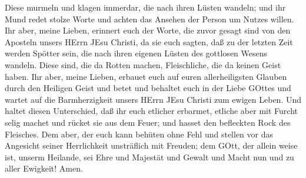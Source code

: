 Diese murmeln und klagen immerdar, die nach ihren Lüsten wandeln; und
ihr Mund redet stolze Worte und achten das Ansehen der Person um Nutzes
willen.  Ihr aber, meine Lieben, erinnert euch der Worte,
die zuvor gesagt sind von den Aposteln unsers HErrn JEsu Christi,
 da sie euch sagten, daß zu der letzten Zeit werden Spötter
sein, die nach ihren eigenen Lüsten des gottlosen Wesens wandeln.
 Diese sind, die da Rotten machen, Fleischliche, die da
keinen Geist haben.  Ihr aber, meine Lieben, erbauet euch
auf euren allerheiligsten Glauben durch den Heiligen Geist und betet
 und behaltet euch in der Liebe GOttes und wartet auf die
Barmherzigkeit unsers HErrn JEsu Christi zum ewigen Leben. 
Und haltet diesen Unterschied, daß ihr euch etlicher erbarmet,
 etliche aber mit Furcht selig machet und rücket sie aus
dem Feuer; und hasset den befleckten Rock des Fleisches. 
Dem aber, der euch kann behüten ohne Fehl und stellen vor das Angesicht
seiner Herrlichkeit unsträflich mit Freuden;  dem GOtt, der
allein weise ist, unserm Heilande, sei Ehre und Majestät und Gewalt und
Macht nun und zu aller Ewigkeit! Amen.
